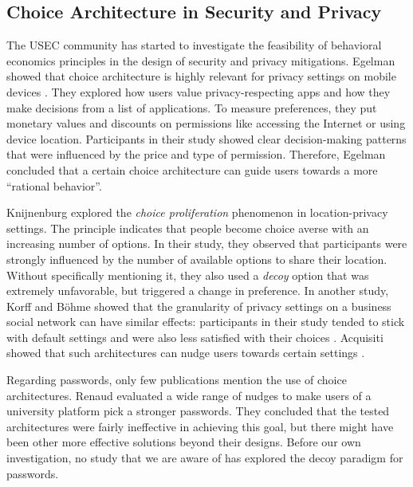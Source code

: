 \subsection{Choice Architecture in Security and Privacy}
The \gls{USEC} community has started to investigate the feasibility of behavioral economics principles in the design of security and privacy mitigations. Egelman \etal showed that choice architecture is highly relevant for privacy settings on mobile devices \cite{Egelman2013ChoiceArchitecture}. They explored how users value privacy-respecting apps and how they make decisions from a list of applications. To measure preferences, they put monetary values and discounts on permissions like accessing the Internet or using device location. Participants in their study showed clear decision-making patterns that were influenced by the price and type of permission. Therefore, Egelman \etal concluded that a certain choice architecture can guide users towards a more ``rational behavior''. 

Knijnenburg \etal \cite{Knijnenburg2013MorePrivacyOptions} explored the \textit{choice proliferation} phenomenon in location-privacy settings. The principle indicates that people become choice averse with an increasing number of options. In their study, they observed that participants were strongly influenced by the number of available options to share their location. Without specifically mentioning it, they also used a \textit{decoy} option that was extremely unfavorable, but triggered a change in preference. In another study, Korff and Böhme showed that the granularity of privacy settings on a business social network can have similar effects: participants in their study tended to stick with default settings and were also less satisfied with their choices \cite{Korff2014TooMuchChoice}. Acquisiti \etal showed that such architectures can nudge users towards certain settings \cite{Acquisti2017NudgesPrivacySecurity}. 

Regarding passwords, only few publications mention the use of choice architectures. Renaud \etal evaluated a wide range of nudges to make users of a university platform pick a stronger passwords. They concluded that the tested architectures were fairly ineffective in achieving this goal, but there might have been other more effective solutions beyond their designs. Before our own investigation, no study that we are aware of has explored the decoy paradigm for passwords. 


